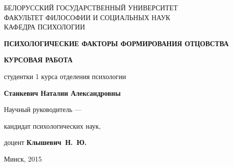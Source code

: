 \documentclass{../../common/thesisbyxetex}
\begin{document}

\begin{titlepage}
\newpage

\begin{center}
\large \uppercase{Белорусский государственный университет \\
факультет философии и социальных наук\\
кафедра психологии}
\end{center}
 
\vspace{14em}



\begin{center}
\Large \uppercase{\textbf{Психологические факторы формирования отцовства}}
\end{center}
\vspace{1em}

\begin{center}
\uppercase{\textbf{Курсовая работа}}
\end{center}

\vspace{10em}
 
\begin{flushright}
\parbox{0.6\textwidth}{
студентки 1 курса отделения психологии

\textbf{Станкевич Наталии Александровны}

\vspace{2em}

Научный руководитель ---

\vspace{0.25em}
кандидат психологических наук, 

доцент \textbf{Клышевич~Н.~Ю.}

}%
\end{flushright}
 
\vspace{\fill}

\begin{center}
Минск, 2015
\end{center}

\end{titlepage} 


\end{document}
